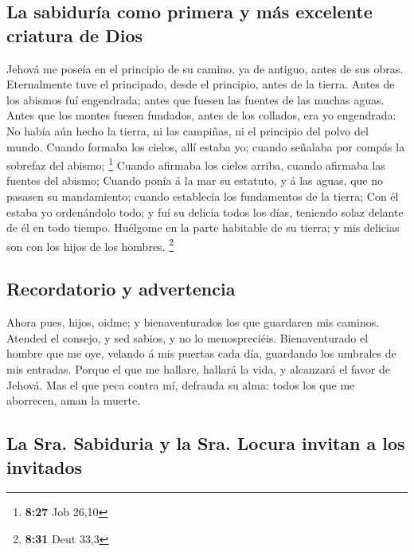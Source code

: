 \hypertarget{la-sabiduruxeda-como-primera-y-muxe1s-excelente-criatura-de-dios}{%
\subsection{La sabiduría como primera y más excelente criatura de
Dios}\label{la-sabiduruxeda-como-primera-y-muxe1s-excelente-criatura-de-dios}}

 Jehová me poseía en el principio de su camino, ya de
antiguo, antes de sus obras.  Eternalmente tuve el
principado, desde el principio, antes de la tierra.  Antes
de los abismos fuí engendrada; antes que fuesen las fuentes de las
muchas aguas.  Antes que los montes fuesen fundados, antes
de los collados, era yo engendrada:  No había aún hecho la
tierra, ni las campiñas, ni el principio del polvo del mundo.
 Cuando formaba los cielos, allí estaba yo; cuando señalaba
por compás la sobrefaz del abismo; \footnote{\textbf{8:27} Job 26,10}
 Cuando afirmaba los cielos arriba, cuando afirmaba las
fuentes del abismo;  Cuando ponía á la mar su estatuto, y á
las aguas, que no pasasen su mandamiento; cuando establecía los
fundamentos de la tierra;  Con él estaba yo ordenándolo
todo; y fuí su delicia todos los días, teniendo solaz delante de él en
todo tiempo.  Huélgome en la parte habitable de su tierra;
y mis delicias son con los hijos de los hombres. \footnote{\textbf{8:31}
  Deut 33,3}

\hypertarget{recordatorio-y-advertencia}{%
\subsection{Recordatorio y
advertencia}\label{recordatorio-y-advertencia}}

 Ahora pues, hijos, oidme; y bienaventurados los que
guardaren mis caminos.  Atended el consejo, y sed sabios, y
no lo menospreciéis.  Bienaventurado el hombre que me oye,
velando á mis puertas cada día, guardando los umbrales de mis entradas.
 Porque el que me hallare, hallará la vida, y alcanzará el
favor de Jehová.  Mas el que peca contra mí, defrauda su
alma: todos los que me aborrecen, aman la muerte.

\hypertarget{la-sra.-sabiduria-y-la-sra.-locura-invitan-a-los-invitados}{%
\subsection{La Sra. Sabiduria y la Sra. Locura invitan a los
invitados}\label{la-sra.-sabiduria-y-la-sra.-locura-invitan-a-los-invitados}}

